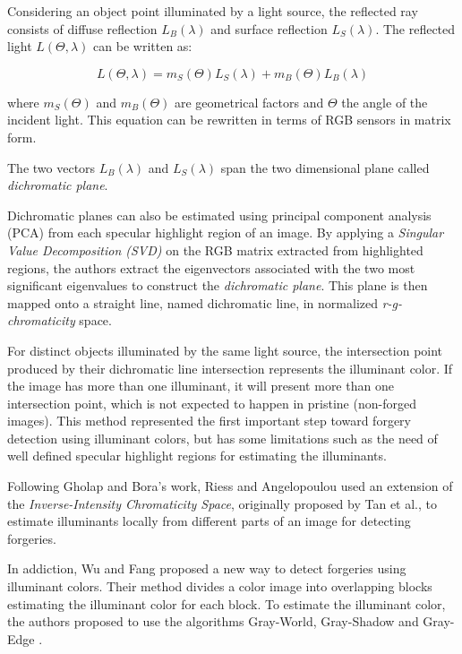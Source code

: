 Considering an object point illuminated by a light source, the reflected ray consists of diffuse reflection $L_B (\lambda)$ and surface reflection $L_S (\lambda)$. The reflected light $L(\Theta, \lambda)$ can be written as:

\begin{equation}
L(\Theta, \lambda) = m_S(\Theta) L_S(\lambda) + m_B(\Theta) L_B(\lambda)
\end{equation}

where $m_S(\Theta)$ and $m_B(\Theta)$ are geometrical factors and $\Theta$ the angle of the incident light. This equation can be rewritten in terms of RGB sensors in matrix form.

The two vectors $L_B(\lambda)$ and $L_S(\lambda)$ span the two dimensional plane called \emph{dichromatic plane}.

Dichromatic planes can also be estimated using principal component analysis (PCA) from each specular highlight region of an image. By applying a \emph{Singular Value Decomposition (SVD)} on the RGB matrix extracted from highlighted regions, the authors extract the eigenvectors associated with the two most significant eigenvalues to construct the \emph{dichromatic plane}. This plane is then mapped onto a straight line, named dichromatic line, in normalized \emph{r-g-chromaticity} space. 

For distinct objects illuminated by the same light source, the intersection point produced by their dichromatic line intersection represents the illuminant color. If the image has more than one illuminant, it will present more than one intersection point, which is not expected to happen in pristine (non-forged images). This method represented the first important step toward forgery detection using illuminant colors, but has some limitations such as the need of well defined specular highlight regions for estimating the illuminants.

Following Gholap and Bora’s work, Riess and Angelopoulou\cite{riess2010scene} used an extension of the \emph{Inverse-Intensity Chromaticity Space}, originally proposed by Tan et al.\cite{tan2004color}, to estimate illuminants locally from different parts of an image for detecting forgeries.

In addiction, Wu and Fang\cite{wu2011image} proposed a new way to detect forgeries using illuminant colors. Their method divides a color image into overlapping blocks estimating the illuminant color for each block. To estimate the illuminant color, the authors proposed to use the algorithms Gray-World, Gray-Shadow and Gray-Edge \cite{van2007edge}.

